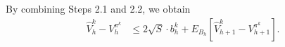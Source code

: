 \documentclass[11pt]{article}
\newcommand{\1}{\mathbbm{1}}
\begin{document}


By combining Steps 2.1 and 2.2, we obtain
\begin{align}\label{eq:recur1}
\hat{V}_h^k-V_h^{\pi^k}&\le 2 \sqrt{S} \cdot b_h^k+ E_{B_h}[\hat{V}_{h+1}^k-V_{h+1}^{\pi^k}].
\end{align}
\end{document}
